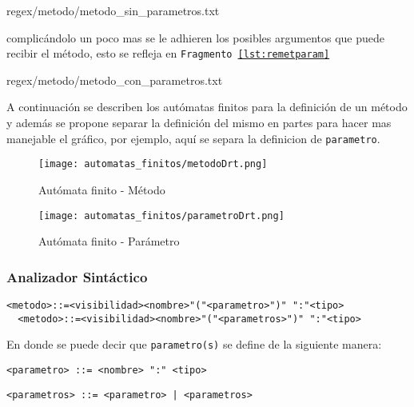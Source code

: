 \begin{lstinputlisting}[basicstyle=\footnotesize\ttfamily, caption={Regex - Método
(sin parámetro(s))},
label=lst:remetnoparam, language=Java]{regex/metodo/metodo_sin_parametros.txt}

complicándolo un poco mas se le adhieren los posibles argumentos que puede
recibir el método, esto se refleja en \texttt{Fragmento
\ref{lst:remetparam}}

\begin{lstinputlisting}[basicstyle=\footnotesize\ttfamily, caption={Regex - Método
  (con parámetro(s))},
  label=lst:remetparam, language=Java]{regex/metodo/metodo_con_parametros.txt}

A continuación se describen los autómatas finitos para la definición de un método y
además se propone separar la definición del mismo en partes para hacer mas
manejable el gráfico, por ejemplo, aquí se separa la definicion de \texttt{parametro}.

\begin{figure}[H]
	\centering
	\texttt{[image: automatas\_finitos/metodoDrt.png]}
	\caption{Autómata finito - Método}
	\label{fig:metodo_af}
\end{figure}

\begin{figure}[H]
	\centering
	\texttt{[image: automatas\_finitos/parametroDrt.png]}
	\caption{Autómata finito - Parámetro}
	\label{fig:metodo_parametro_af}
\end{figure}

\subsubsection{Analizador Sintáctico}

\begin{lstlisting}[caption={BNF - Método}, basicstyle=\footnotesize\ttfamily]
  <metodo>::=<visibilidad><nombre>"("<parametro>")" ":"<tipo>
  <metodo>::=<visibilidad><nombre>"("<parametros>")" ":"<tipo>
\end{lstlisting}

En donde se puede decir que \texttt{parametro(s)} se define de la siguiente
manera:

\begin{lstlisting}[basicstyle=\footnotesize\ttfamily]
  <parametro> ::= <nombre> ":" <tipo>
\end{lstlisting}

\begin{lstlisting}[basicstyle=\footnotesize\ttfamily]
  <parametros> ::= <parametro> | <parametros>
\end{lstlisting}


\end{lstinputlisting}
\end{lstinputlisting}

